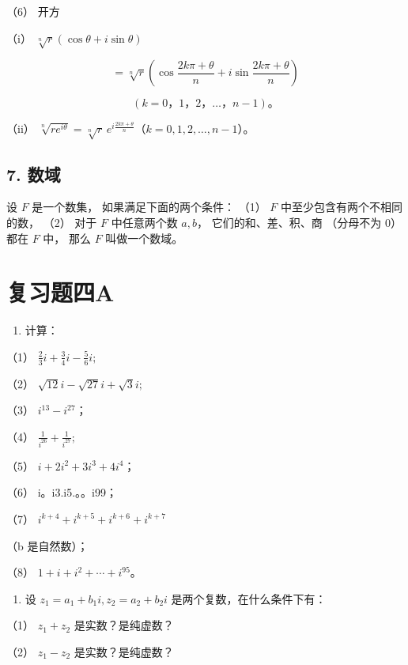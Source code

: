 （6） 开方

（i） \(\sqrt[n]{r} (\cos \theta + i\sin \theta)\)

\[
= \sqrt [ n ]{r} \left(\cos \frac {2 k \pi + \theta}{n} + i \sin \frac {2 k \pi + \theta}{n}\right)
\]

\[
(k = 0\text{，} 1\text{，} 2\text{，} \dots \text{，} n - 1)\text{。}
\]

（ii）
\(\sqrt[n]{re^{i\theta}}=\sqrt[n]{r}\,e^{i\frac{2k\pi+\theta}{n}}\)（\(k=0,1,2,\dots,n-1\)）。

\subsection{7. 数域}

设 \(F\) 是一个数集， 如果满足下面的两个条件： （1） \(F\)
中至少包含有两个不相同的数， （2） 对于 \(F\) 中任意两个数 \(a, b\)，
它们的和、差、积、商 （分母不为 0） 都在 \(F\) 中， 那么 \(F\)
叫做一个数域。

\section{复习题四A}

\begin{enumerate}
\item
  计算：
\end{enumerate}

（1） \(\frac{2}{3} i + \frac{3}{4} i - \frac{5}{6} i;\)

（2） \(\sqrt{12} i - \sqrt{27} i + \sqrt{3} i;\)

（3） \(i^{13} - i^{27}\)；

（4） \(\frac{1}{i^{26}} + \frac{1}{i^{27}};\)

（5） \(i + 2i^2 + 3i^3 + 4i^4\)；

（6） i。i3.i5.。。i99；

（7） \(i^{k + 4} + i^{k + 5} + i^{k + 6} + i^{k + 7}\)

（b 是自然数）；

（8） \(1 + i + i^2 + \cdots + i^{95}\)。

\begin{enumerate}[start=2]
\item
  设 \(z_{1} = a_{1} + b_{1}i, z_{2} = a_{2} + b_{2}i\)
  是两个复数，在什么条件下有：
\end{enumerate}

（1） \(z_{1} + z_{2}\) 是实数？是纯虚数？

（2） \(z_{1} - z_{2}\) 是实数？是纯虚数？

